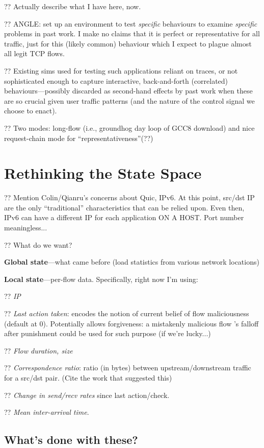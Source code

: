 \documentclass[conference, letterpaper, 10pt, times]{IEEEtran}
\begin{document}
?? Actually describe what I have here, now.

?? ANGLE: set up an environment to test \emph{specific} behaviours to examine \emph{specific} problems in past work. I make no claims that it is perfect or representative for all traffic, just for this (likely common) behaviour which I expect to plague almost all legit TCP flows.

?? Existing sims used for testing such applications reliant on traces, or not sophisticated enough to capture interactive, back-and-forth (correlated) behaviours---possibly discarded as second-hand effects by past work when these are so crucial given user traffic patterns (and the nature of the control signal we choose to enact).

?? Two modes: long-flow (i.e., groundhog day loop of GCC8 download) and nice request-chain mode for ``representativeness''(??)

\section{Rethinking the State Space}\label{sec:rethinking-the-state-space}

?? Mention Colin/Qianru's concerns about Quic, IPv6. At this point, src/dst IP are the only ``traditional'' characteristics that can be relied upon. Even then, IPv6 can have a different IP for each application ON A HOST. Port number meaningless...

?? What do we want?

\textbf{Global state}---what came before (load statistics from various network locations)

\textbf{Local state}---per-flow data. Specifically, right now I'm using:

?? \emph{IP}

?? \emph{Last action taken}: encodes the notion of current belief of flow maliciousness (default at 0). Potentially allows forgiveness: a mistakenly malicious flow 's falloff after punishment could be used for such purpose (if we're lucky...)

?? \emph{Flow duration, size}

?? \emph{Correspondence ratio}: ratio (in bytes) between upstream/downstream traffic for a src/dst pair. (Cite the work that suggested this)

?? \emph{Change in send/recv rates} since last action/check.

?? \emph{Mean inter-arrival time}.

\subsection{What's done with these?}
\end{document}
